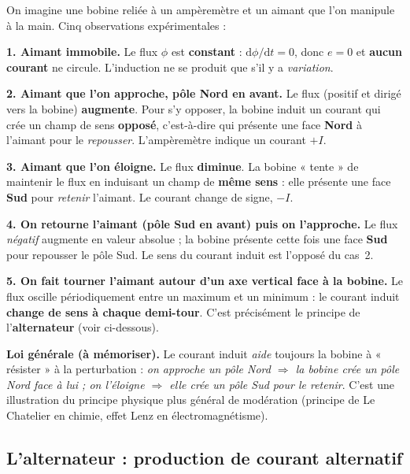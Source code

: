 \documentclass[11pt,a4paper]{article}
\newcommand{\dd}{\mathrm{d}}
\begin{document}
\begin{exemple}
On imagine une bobine reliée à un ampèremètre et un aimant que l'on manipule à la main. Cinq
observations expérimentales :

\smallskip
\textbf{1. Aimant immobile.} Le flux $\phi$ est \textbf{constant} : $\dd\phi/\dd t=0$, donc
$e=0$ et \textbf{aucun courant} ne circule. L'induction ne se produit que s'il y a
\emph{variation}.

\textbf{2. Aimant que l'on approche, pôle Nord en avant.} Le flux (positif et dirigé vers la
bobine) \textbf{augmente}. Pour s'y opposer, la bobine induit un courant qui crée un champ de sens
\textbf{opposé}, c'est-à-dire qui présente une face \textbf{Nord} à l'aimant pour le \emph{repousser}.
L'ampèremètre indique un courant $+I$.

\textbf{3. Aimant que l'on éloigne.} Le flux \textbf{diminue}. La bobine « tente » de maintenir le
flux en induisant un champ de \textbf{même sens} : elle présente une face \textbf{Sud} pour
\emph{retenir} l'aimant. Le courant change de signe, $-I$.

\textbf{4. On retourne l'aimant (pôle Sud en avant) puis on l'approche.} Le flux \emph{négatif}
augmente en valeur absolue ; la bobine présente cette fois une face \textbf{Sud} pour repousser le
pôle Sud. Le sens du courant induit est l'opposé du cas~2.

\textbf{5. On fait tourner l'aimant autour d'un axe vertical face à la bobine.} Le flux oscille
périodiquement entre un maximum et un minimum : le courant induit \textbf{change de sens à chaque
demi-tour}. C'est précisément le principe de l'\textbf{alternateur} (voir ci-dessous).

\smallskip
\textbf{Loi générale (à mémoriser).} Le courant induit \emph{aide} toujours la bobine à
« résister » à la perturbation : \emph{on approche un pôle Nord $\Rightarrow$ la bobine crée un pôle
Nord face à lui ; on l'éloigne $\Rightarrow$ elle crée un pôle Sud pour le retenir}. C'est une
illustration du principe physique plus général de modération (principe de Le Chatelier en chimie,
effet Lenz en électromagnétisme).
\end{exemple}

\subsection{L'alternateur : production de courant alternatif}
\end{document}
